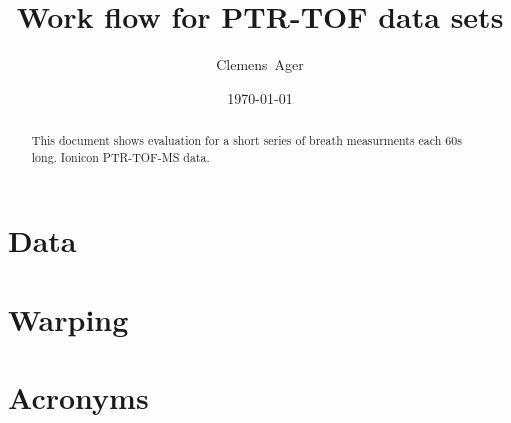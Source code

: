 \documentclass[twocolumn]{article}
\title{Work flow for PTR-TOF data sets}
\author{Clemens~Ager}
\date{\today}
\begin{document}
\maketitle

\begin{abstract}
  This document shows evaluation for a short series of breath
  measurments each \si{60}{s} long.
  Ionicon \ac{PTR-TOF-MS} data.  
\end{abstract}


\setcounter{tocdepth}{2}
\tableofcontents



\section{Data}


\section{Warping}


\appendix 
\section{Acronyms}


\printbibliography
\end{document}
